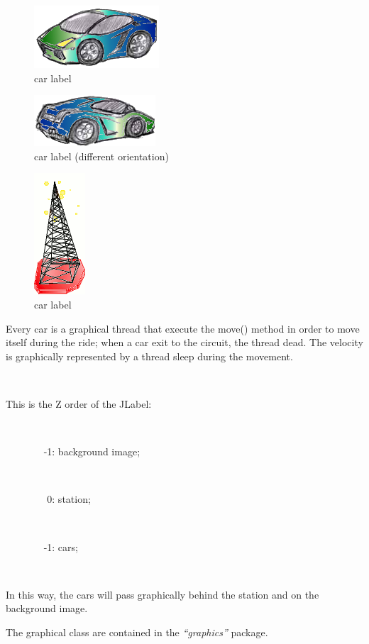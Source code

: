 \documentclass[a4paper,titlepage]{article}
\begin{document}
\begin{figure}[!h]
\centering
\includegraphics[scale=0.2]{../car.png}
\caption{car label}
\end{figure}


\begin{figure}[!h]
\centering
\includegraphics[scale=0.2]{../car2.png}
\caption{car label (different orientation)}
\end{figure}

\begin{figure}[!h]
\centering
\includegraphics[scale=0.5]{../radio.png}
\caption{car label}
\end{figure}


Every car is a graphical thread that execute the move() method in order to move itself during the ride; when a car exit to the circuit, the thread dead. The velocity is graphically represented by a thread sleep during the movement.

~

This is the Z order of the JLabel:

~

~ ~ ~ ~ ~-1: background image;

~

~ ~ ~ ~ ~ 0: station;

~

~ ~ ~ ~ ~-1: cars;

~

In this way, the cars will pass graphically behind the station and on the background image.


The graphical class are contained in the \textit{``graphics''} package.
\end{document}
